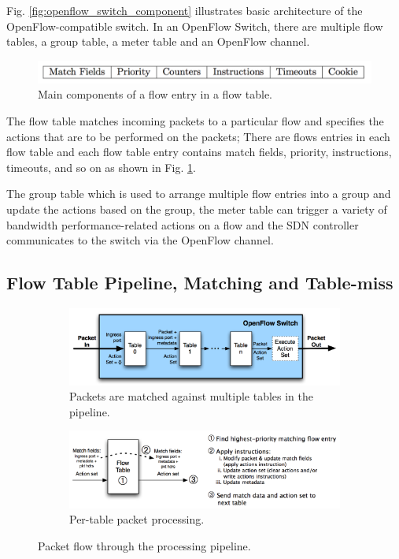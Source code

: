 Fig. \ref{fig:openflow_switch_component} illustrates basic architecture of the OpenFlow-compatible switch. In an OpenFlow Switch, there are multiple flow tables, a group table, a meter table and an OpenFlow channel.

\begin{figure}[!ht]
\centering
\includegraphics[width=\textwidth]{./fig/flow_entry}
\caption{Main components of a flow entry in a flow table. \cite{openflow-spec}}
\label{fig:flow_entry}
\end{figure}

The flow table matches incoming packets to a particular flow and specifies the actions that are to be performed on the packets;
There are flows entries in each flow table and each flow table entry contains match fields, priority, instructions, timeouts, and so on as shown in Fig. \ref{fig:flow_entry}.

The group table which is used to arrange multiple flow entries into a group and update the actions based on the group, the meter table can trigger a variety of bandwidth performance-related actions on a flow and the SDN controller communicates to the switch via the OpenFlow channel.



\subsection{Flow Table Pipeline, Matching and Table-miss}

\begin{figure}[!ht]
  \begin{subfigure}[b]{\textwidth}
    \includegraphics[width=\textwidth]{./fig/openflow_pipeline}
    \caption{Packets are matched against multiple tables in the pipeline.}
    \label{fig:openflow_pipeline2}
  \end{subfigure}
  \hfill
  \begin{subfigure}[b]{\textwidth}
    \includegraphics[width=\textwidth]{./fig/openflow_pipeline2}
    \caption{Per-table packet processing.}
    \label{fig:openflow_pipeline3}
  \end{subfigure}
  \caption{Packet flow through the processing pipeline. \cite{openflow-spec}}
  \label{fig:openflow_pipeline}
\end{figure}


